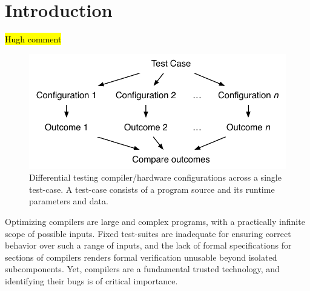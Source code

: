 \section{Introduction}\label{sec:intro}

\hl{Hugh comment}

\begin{figure}
  \centering
  \includegraphics[width=.85\columnwidth]{img/difftest} %
  \caption{%
    Differential testing compiler/hardware configurations across a single test-case. A test-case consists of a program source and its runtime parameters and data. %
  }%
  \label{fig:difftest}
\end{figure}

\noindent
Optimizing compilers are large and complex programs, with a practically infinite scope of possible inputs. Fixed test-suites are inadequate for ensuring correct behavior over such a range of inputs, and the lack of formal specifications for sections of compilers renders formal verification unusable beyond isolated subcomponents. Yet, compilers are a fundamental trusted technology, and identifying their bugs is of critical importance.


